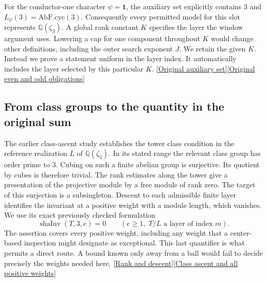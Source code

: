 \documentclass[12pt,letterpaper]{article}
\begin{document}
For the conductor-one character \(\psi=\mathbf 1\), the auxiliary set explicitly contains 3 and \(L_\psi(3)=\mathrm{AbF.cyc}(3)\). Consequently every permitted model for this slot represents \(\mathbb Q(\zeta_3)\). A global rank constant \(K\) specifies the layer the window argument uses. Lowering a cap for one component throughout \(K\) would change other definitions, including the outer search exponent \(J\). We retain the given \(K\). Instead we prove a statement uniform in the layer index. It automatically includes the layer selected by this particular \(K\). \href{https://github.com/nousentllc/riemann-hypothesis/blob/40e56bab026552e089d7afcfeff08d2defb9c005/src/Development/AutomorphicArithmetic/AutomorphicVarieties/StmtFields.lean#L58-L67}{[Original auxiliary set]}\quad\href{https://github.com/nousentllc/riemann-hypothesis/blob/40e56bab026552e089d7afcfeff08d2defb9c005/src/Development/AutomorphicArithmetic/AutomorphicVarieties/PrimeSetBoundDataOfPrimitiveChar.lean#L32-L42}{[Original even and odd obligations]}

\subsection{From class groups to the quantity in the original sum}
The earlier class-ascent study establishes the tower class condition in the reference realization \(L\) of \(\mathbb Q(\zeta_3)\). In its stated range the relevant class group has order prime to 3. Cubing on such a finite abelian group is surjective. Its quotient by cubes is therefore trivial. The rank estimates along the tower give a presentation of the projective module by a free module of rank zero. The target of this surjection is a subsingleton. Descent to each admissible finite layer identifies the invariant at a positive weight with a module length, which vanishes. We use its exact previously checked formulation
\[
  \operatorname{shaInv}(T,3,e)=0
   \qquad(e\ge1,\; T/L\text{ a layer of index }m).
\]
The assertion covers every positive weight, including any weight that a center-based inspection might designate as exceptional. This last quantifier is what permits a direct route. A bound known only away from a ball would fail to decide precisely the weights needed here. \href{https://github.com/nousentllc/riemann-hypothesis/blob/4b1c9fbbfb9bc50a3f791c2c1f3d7f2adb336c87/research/uriel/experiments/slot-three/RankZero.lean#L34-L70}{[Rank and descent]}\quad\href{https://github.com/nousentllc/riemann-hypothesis/blob/e674cb750ef96b2f5e7cd46586ea4edb9998715a/research/uriel/experiments/ascent-witness/TowerResult.lean}{[Class ascent and all positive weights]}
\end{document}
